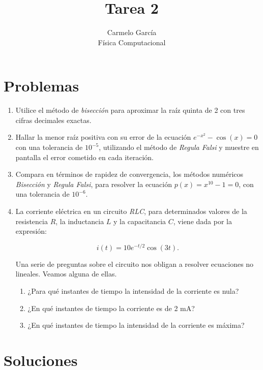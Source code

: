 \documentclass[12pt]{article}
\begin{document}
\title{Tarea 2}
\author{Carmelo García\\ 
Física Computacional}

\maketitle

\section{Problemas}


\begin{enumerate}
    \item \label{p1} Utilice el método de \textit{bisección} para aproximar la raíz quinta de 2 con tres cifras decimales exactas.
    
    \item \label{p2}Hallar la menor raíz positiva con su error de la ecuación $e^{-x^2} - \cos(x) = 0$ con una tolerancia de $10^{-5}$, utilizando el método de \textit{Regula Falsi} y muestre en pantalla el error cometido en cada iteración.
    
    \item \label{p3}Compara en términos de rapidez de convergencia, los métodos numéricos \textit{Bisección} y \textit{Regula Falsi}, para resolver la ecuación $p(x) = x^{10} - 1 = 0$, con una tolerancia de $10^{-6}$.
    
    \item \label{p4} La corriente eléctrica en un circuito \textit{RLC}, para determinados valores de la resistencia $R$, la inductancia $L$ y la capacitancia $C$, viene dada por la expresión:
    

\[ i(t) = 10e^{-t/2}\cos(3t). \]


    Una serie de preguntas sobre el circuito nos obligan a resolver ecuaciones no lineales. Veamos alguna de ellas.
    \begin{enumerate}
        \item ¿Para qué instantes de tiempo la intensidad de la corriente es nula?
        \item ¿En qué instantes de tiempo la corriente es de 2 mA?
        \item ¿En qué instantes de tiempo la intensidad de la corriente es máxima?
    \end{enumerate}
\end{enumerate}


\section{Soluciones}
\end{document}
